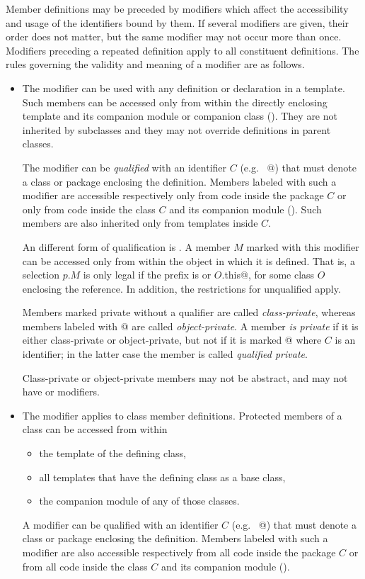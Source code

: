 Member definitions may be preceded by modifiers which affect the
accessibility and usage of the identifiers bound by them.  If several
modifiers are given, their order does not matter, but the same
modifier may not occur more than once.  Modifiers preceding a repeated
definition apply to all constituent definitions.  The rules governing
the validity and meaning of a modifier are as follows.
\begin{itemize}
\item
The  modifier can be used with any definition or
declaration in a template.  Such members can be accessed only from
within the directly enclosing template and its companion module or 
companion class ().  They
are not inherited by subclasses and they may not override definitions
in parent classes.

The modifier can be {\em qualified} with an identifier $C$ (e.g.
~\lstinline@private[$C$]@) that must denote a class or package
enclosing the definition.  Members labeled with such a modifier are
accessible respectively only from code inside the package $C$ or only
from code inside the class $C$ and its companion module
(). Such members are also inherited only from
templates inside $C$.

An different form of qualification is . A member
$M$ marked with this modifier can be accessed only from within
the object in which it is defined. That is, a selection $p.M$ is only
legal if the prefix is  or \lstinline@$O$.this@, for some
class $O$ enclosing the reference. In addition, the restrictions for
unqualified  apply.

Members marked private without a qualifier are called {\em
class-private}, whereas members labeled with \lstinline@private[this]@
are called {\em object-private}.  A member {\em is private} if it is
either class-private or object-private, but not if it is marked
\lstinline@private[$C$]@ where $C$ is an identifier; in the latter
case the member is called {\em qualified private}.

Class-private or object-private members may not be abstract, and may
not have  or  modifiers.
\item
The  modifier applies to class member definitions.
Protected members of a class can be accessed from within
\begin{itemize}
\item the template of the defining class, 
\item all templates that have the defining class as a base class,
\item the companion module of any of those classes.
\end{itemize}
A  modifier can be qualified with an
identifier $C$ (e.g.  ~\lstinline@protected[$C$]@) that must denote a
class or package enclosing the definition.  Members labeled with such
a modifier are also accessible respectively from all code inside the
package $C$ or from all code inside the class $C$ and its companion
module ().


\end{itemize}
